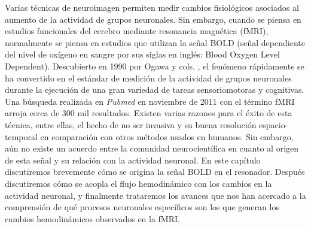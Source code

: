 
Varias técnicas de neuroimagen permiten medir cambios fisiológicos asociados al aumento de la actividad de grupos neuronales. Sin embargo, cuando se piensa en estudios funcionales del cerebro mediante resonancia magnética (fMRI), normalmente se piensa en estudios que utilizan la señal BOLD (señal dependiente del nivel de oxígeno en sangre por sus siglas en inglés: Blood Oxygen Level Dependent). Descubierto en 1990 por Ogawa y cols. \cite{OgawaS1990}, el fenómeno rápidamente se ha convertido en el estándar de medición de la actividad de grupos neuronales durante la ejecución de una gran variedad de tareas sensoriomotoras y cognitivas. Una búsqueda realizada en \emph{Pubmed} en noviembre de 2011 con el término fMRI arroja cerca de 300 mil resultados. Existen varias razones para el éxito de esta técnica, entre ellas, el hecho de no ser invasiva y su buena resolución espacio-temporal en comparación con otros métodos usados en humanos. Sin embargo, aún no existe un acuerdo entre la comunidad neurocientífica en cuanto al origen de esta señal y su relación con la actividad neuronal. En este capítulo discutiremos brevemente cómo se origina la señal BOLD en el resonador. Después discutiremos cómo se acopla el flujo hemodinámico con los cambios en la actividad neuronal, y finalmente trataremos los avances que nos han acercado a la comprensión de qué procesos neuronales específicos son los que generan los cambios hemodinámicos observados en la fMRI.

